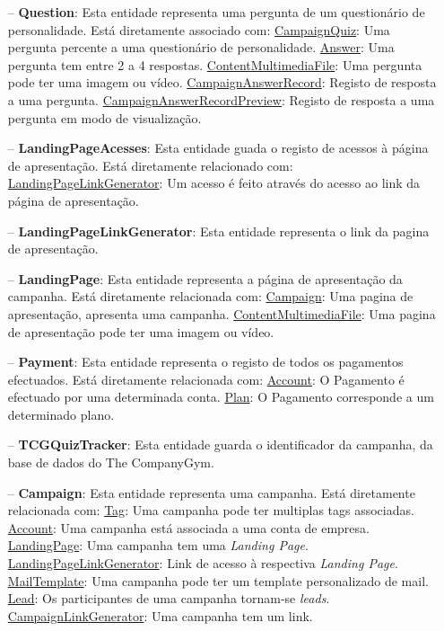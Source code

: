 \begin{itemize}
	\item[--] \textbf{Question}: Esta entidade representa uma pergunta de um questionário de personalidade. Está diretamente associado com:
		\subitem \underline{CampaignQuiz}: Uma pergunta percente a uma questionário de personalidade.
		\subitem \underline{Answer}: Uma pergunta tem entre 2 a 4 respostas.
		\subitem \underline{ContentMultimediaFile}: Uma pergunta pode ter uma imagem ou vídeo.
		\subitem \underline{CampaignAnswerRecord}: Registo de resposta a uma pergunta.
		\subitem \underline{CampaignAnswerRecordPreview}: Registo de resposta a uma pergunta em modo de visualização.
	\item[--] \textbf{LandingPageAcesses}: Esta entidade guada o registo de acessos à página de apresentação. Está diretamente relacionado com:
		\subitem \underline{LandingPageLinkGenerator}: Um acesso é feito através do acesso ao link da página de apresentação.
	\item[--] \textbf{LandingPageLinkGenerator}: Esta entidade representa o link da pagina de apresentação. 
	\item[--] \textbf{LandingPage}: Esta entidade representa a página de apresentação da campanha. Está diretamente relacionada com:
		\subitem \underline{Campaign}: Uma pagina de apresentação, apresenta uma campanha.
		\subitem \underline{ContentMultimediaFile}: Uma pagina de apresentação pode ter uma imagem ou vídeo.
	\item[--] \textbf{Payment}: Esta entidade representa o registo de todos os pagamentos efectuados. Está diretamente relacionada com:
		\subitem \underline{Account}: O Pagamento é efectuado por uma determinada conta.
		\subitem \underline{Plan}: O Pagamento corresponde a um determinado plano.
	\item[--] \textbf{TCGQuizTracker}: Esta entidade guarda o identificador da campanha, da base de dados do The CompanyGym.
	\item[--] \textbf{Campaign}: Esta entidade representa uma campanha.  Está diretamente relacionada com:
		\subitem \underline{Tag}: Uma campanha pode ter multiplas tags associadas.
		\subitem \underline{Account}: Uma campanha está associada a uma conta de empresa.
		\subitem \underline{LandingPage}: Uma campanha tem uma \textit{Landing Page}.
		\subitem \underline{LandingPageLinkGenerator}: Link de acesso à respectiva \textit{Landing Page}. 
		\subitem \underline{MailTemplate}: Uma campanha pode ter um template personalizado de mail.
		\subitem \underline{Lead}: Os participantes de uma campanha tornam-se \textit{leads}.
		\subitem \underline{CampaignLinkGenerator}: Uma campanha tem um link.

\end{itemize}
